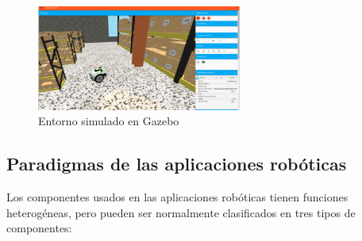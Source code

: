 \begin{figure}[H]
    \centering
    \includegraphics[width=0.6\textwidth]{figures/intro/gazebo.png}
    \caption{Entorno simulado en Gazebo}
    \label{fig:ejemplo}
\end{figure}

\subsection{Paradigmas de las aplicaciones robóticas}

Los componentes usados en las aplicaciones robóticas tienen funciones heterogéneas, pero pueden ser normalmente clasificados en tres tipos de componentes: 

